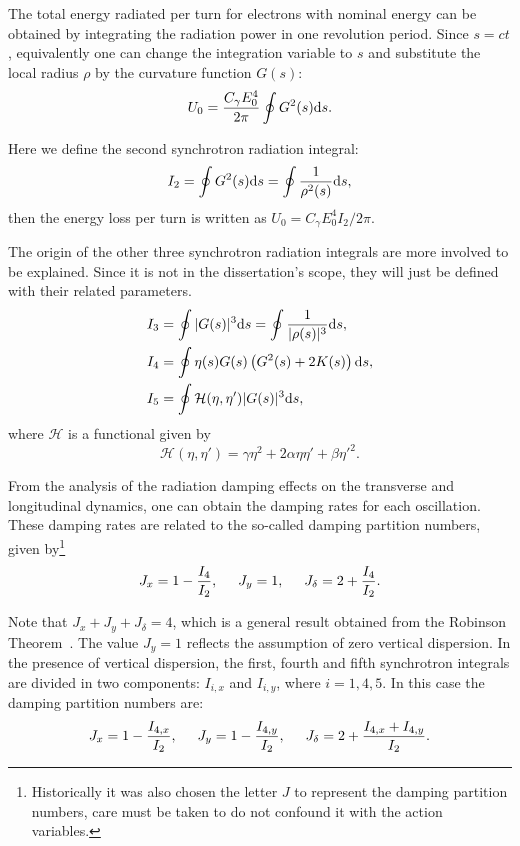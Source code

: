 The total energy radiated per turn for electrons with nominal energy can be obtained by integrating the radiation power in one revolution period. Since $s = ct$, equivalently one can change the integration variable to $s$ and substitute the local radius $\rho$ by the curvature function $G(s)$:
\begin{equation}
U_0 = \dfrac{C_{\gamma}E_0^4}{2\pi} \oint G^{2}(s) \mathrm{d} s.    
\end{equation}

Here we define the second synchrotron radiation integral:
\begin{equation}
    I_2 = \oint G^{2}(s) \mathrm{d} s = \oint \dfrac{1}{\rho^2(s)} \mathrm{d} s,
\end{equation}
then the energy loss per turn is written as $U_0 = C_{\gamma}E_0^4 I_2/2\pi$.

The origin of the other three synchrotron radiation integrals are more involved to be explained. Since it is not in the dissertation's scope, they will just be defined with their related parameters. 
\begin{align}
    I_3 &= \oint |G(s)|^3 \mathrm{d} s = \oint \dfrac{1}{|\rho(s)|^3} \mathrm{d} s, \\
    I_4 &= \oint \eta(s) G(s) \left(G^2(s) + 2 K(s)\right) \mathrm{d} s, \\
    I_5 &= \oint \mathcal{H}(\eta, \eta') |G(s)|^3 \mathrm{d} s,
    \label{eq:integral5}
\end{align}
where $\mathcal{H}$ is a functional given by
\begin{equation}
    \mathcal{H}(\eta, \eta') = \gamma \eta^2 + 2 \alpha \eta \eta' + \beta {\eta'}^2.
\end{equation}

From the analysis of the radiation damping effects on the transverse and longitudinal dynamics, one can obtain the damping rates for each oscillation. These damping rates are related to the so-called damping partition numbers, given by\footnote{Historically it was also chosen the letter $J$ to represent the damping partition numbers, care must be taken to do not confound it with the action variables.}
\begin{equation}
    J_x = 1 - \dfrac{I_4}{I_2}, \hspace{0.5cm} J_y = 1, \hspace{0.5cm} J_{\delta} = 2 + \dfrac{I_4}{I_2}.
\end{equation}

Note that $J_x + J_y + J_{\delta} = 4$, which is a general result obtained from the Robinson Theorem~\cite{Robinson1958}. The value $J_y = 1$ reflects the assumption of zero vertical dispersion. In the presence of vertical dispersion, the first, fourth and fifth synchrotron integrals are divided in two components: $I_{i, x}$ and $I_{i, y}$, where $i = 1, 4, 5$. In this case the damping partition numbers are: 
\begin{equation*}
    J_x = 1 - \dfrac{I_{4,x}}{I_2}, \hspace{0.5cm} J_y = 1 - \dfrac{I_{4,y}}{I_2}, \hspace{0.5cm} J_{\delta} = 2 + \dfrac{I_{4,x} + I_{4,y}}{I_2}.
\end{equation*}

